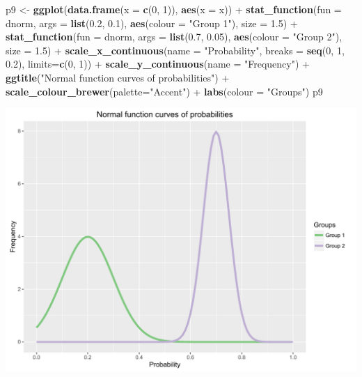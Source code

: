 \documentclass[]{article}
\newenvironment{Shaded}{\begin{snugshade}}{\end{snugshade}}
\newcommand{\KeywordTok}[1]{\textcolor[rgb]{0.13,0.29,0.53}{\textbf{{#1}}}}
\newcommand{\DataTypeTok}[1]{\textcolor[rgb]{0.13,0.29,0.53}{{#1}}}
\newcommand{\DecValTok}[1]{\textcolor[rgb]{0.00,0.00,0.81}{{#1}}}
\newcommand{\FloatTok}[1]{\textcolor[rgb]{0.00,0.00,0.81}{{#1}}}
\newcommand{\StringTok}[1]{\textcolor[rgb]{0.31,0.60,0.02}{{#1}}}
\newcommand{\NormalTok}[1]{{#1}}
\begin{document}
\begin{Shaded}
\begin{Highlighting}[]
\NormalTok{p9 <-}\StringTok{ }\KeywordTok{ggplot}\NormalTok{(}\KeywordTok{data.frame}\NormalTok{(}\DataTypeTok{x =} \KeywordTok{c}\NormalTok{(}\DecValTok{0}\NormalTok{, }\DecValTok{1}\NormalTok{)), }\KeywordTok{aes}\NormalTok{(}\DataTypeTok{x =} \NormalTok{x)) +}
\StringTok{        }\KeywordTok{stat_function}\NormalTok{(}\DataTypeTok{fun =} \NormalTok{dnorm, }\DataTypeTok{args =} \KeywordTok{list}\NormalTok{(}\FloatTok{0.2}\NormalTok{, }\FloatTok{0.1}\NormalTok{),}
                      \KeywordTok{aes}\NormalTok{(}\DataTypeTok{colour =} \StringTok{"Group 1"}\NormalTok{), }\DataTypeTok{size =} \FloatTok{1.5}\NormalTok{) +}
\StringTok{        }\KeywordTok{stat_function}\NormalTok{(}\DataTypeTok{fun =} \NormalTok{dnorm, }\DataTypeTok{args =} \KeywordTok{list}\NormalTok{(}\FloatTok{0.7}\NormalTok{, }\FloatTok{0.05}\NormalTok{),}
                      \KeywordTok{aes}\NormalTok{(}\DataTypeTok{colour =} \StringTok{"Group 2"}\NormalTok{), }\DataTypeTok{size =} \FloatTok{1.5}\NormalTok{) +}
\StringTok{        }\KeywordTok{scale_x_continuous}\NormalTok{(}\DataTypeTok{name =} \StringTok{"Probability"}\NormalTok{,}
                              \DataTypeTok{breaks =} \KeywordTok{seq}\NormalTok{(}\DecValTok{0}\NormalTok{, }\DecValTok{1}\NormalTok{, }\FloatTok{0.2}\NormalTok{),}
                              \DataTypeTok{limits=}\KeywordTok{c}\NormalTok{(}\DecValTok{0}\NormalTok{, }\DecValTok{1}\NormalTok{)) +}
\StringTok{        }\KeywordTok{scale_y_continuous}\NormalTok{(}\DataTypeTok{name =} \StringTok{"Frequency"}\NormalTok{) +}
\StringTok{        }\KeywordTok{ggtitle}\NormalTok{(}\StringTok{"Normal function curves of probabilities"}\NormalTok{) +}
\StringTok{        }\KeywordTok{scale_colour_brewer}\NormalTok{(}\DataTypeTok{palette=}\StringTok{"Accent"}\NormalTok{) +}
\StringTok{        }\KeywordTok{labs}\NormalTok{(}\DataTypeTok{colour =} \StringTok{"Groups"}\NormalTok{)}
\NormalTok{p9}
\end{Highlighting}
\end{Shaded}

\begin{center}\includegraphics{0_all_posts_pdf/function_12-1} \end{center}
\end{document}
